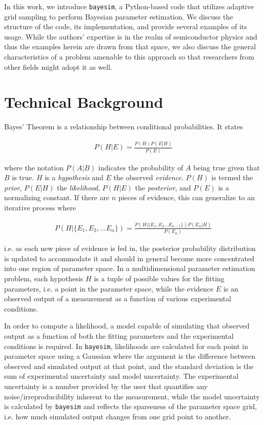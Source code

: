 \documentclass[aps,prl,amsmath,amssymb,superscriptaddress,notitlepage,groupedaddress]{revtex4-1}
\begin{document}
  In this work, we introduce \texttt{bayesim}, a Python-based code that utilizes adaptive grid sampling to perform Bayesian parameter estimation. We discuss the structure of the code, its implementation, and provide several examples of its usage. While the authors' expertise is in the realm of semiconductor physics and thus the examples herein are drawn from that space, we also discuss the general characteristics of a problem amenable to this approach so that researchers from other fields might adopt it as well.

\section*{Technical Background}

 Bayes' Theorem is a relationship between conditional probabilities. It states

 \begin{equation}
   \begin{split}
     \label{Eq:1001}
     P(H|E)=\frac{P(H)P(E|H)}{P(E)}
   \end{split}
 \end{equation}

 where the notation $P(A|B)$ indicates the probability of $A$ being true given that $B$ is true. $H$ is a \textit{hypothesis} and $E$ the observed \textit{evidence}. $P(H)$ is termed the \textit{prior}, $P(E|H)$ the \textit{likelihood}, $P(H|E)$ the \textit{posterior}, and $P(E)$ is a normalizing constant. If there are $n$ pieces of evidence, this can generalize to an iterative process where

 \begin{equation}
   \begin{split}
     \label{Eq:2}
     P(H|\{E_1,E_2,...E_n\}) = \frac{P(H|\{E_1,E_2...E_{n-1}\})P(E_n|H)}{P(E_n)}
   \end{split}
 \end{equation}

 i.e. as each new piece of evidence is fed in, the posterior probability distribution is updated to accommodate it and should in general become more concentrated into one region of parameter space. In a multidimensional parameter estimation problem, each hypothesis $H$ is a tuple of possible values for the fitting parameters, i.e. a point in the parameter space, while the evidence $E$ is an observed output of a measurement as a function of various experimental conditions.

 In order to compute a likelihood, a model capable of simulating that observed output as a function of both the fitting parameters and the experimental conditions is required. In \texttt{bayesim}, likelihoods are calculated for each point in parameter space using a Gaussian where the argument is the difference between observed and simulated output at that point, and the standard deviation is the sum of experimental uncertainty and model uncertainty. The experimental uncertainty is a number provided by the user that quantifies any noise/irreproducibility inherent to the measurement, while the model uncertainty is calculated by \texttt{bayesim} and reflects the sparseness of the parameter space grid, i.e. how much simulated output changes from one grid point to another.
\end{document}
